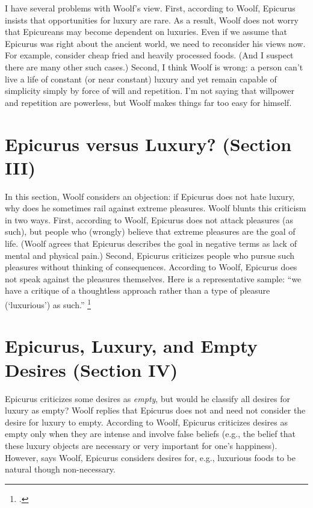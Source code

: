 \documentclass[12pt,letterpaper]{article}
\begin{document}
I have several problems with Woolf's view.
First, according to Woolf, Epicurus insists that opportunities for luxury are rare.
As a result, Woolf does not worry that Epicureans may become dependent on luxuries.
Even if we assume that Epicurus was right about the ancient world, we need to reconsider his views now.
For example, consider cheap fried and heavily processed foods.
(And I suspect there are many other such cases.)
Second, I think Woolf is wrong: a person can't live a life of constant (or near constant) luxury and yet remain capable of simplicity simply by force of will and repetition.
I'm not saying that willpower and repetition are powerless, but Woolf makes things far too easy for himself.

\section*{Epicurus versus Luxury? (Section III)}

In this section, Woolf considers an objection: if Epicurus does not hate luxury, why does he sometimes rail against extreme pleasures.
Woolf blunts this criticism in two ways.
First, according to Woolf, Epicurus does not attack pleasures (as such), but people who (wrongly) believe that extreme pleasures are the goal of life.
(Woolf agrees that Epicurus describes the goal in negative terms as lack of mental and physical pain.)
Second, Epicurus criticizes people who pursue such pleasures without thinking of consequences.
According to Woolf, Epicurus does not speak against the pleasures themselves.
Here is a representative sample: ``we have a critique of a thoughtless approach rather than a type of pleasure (`luxurious') as such.''%
\footcite[][165]{hellenistic-philosophy-brunschwig-sedley-2003}

\section*{Epicurus, Luxury, and Empty Desires (Section IV)}

Epicurus criticizes some desires as \textit{empty}, but would he classify all desires for luxury as empty?
Woolf replies that Epicurus does not and need not consider the desire for luxury to empty.
According to Woolf, Epicurus criticizes desires as empty only when they are intense and involve false beliefs (e.g., the belief that these luxury objects are necessary or very important for one's happiness).
However, says Woolf, Epicurus considers desires for, e.g., luxurious foods to be natural though non-necessary.
\end{document}

